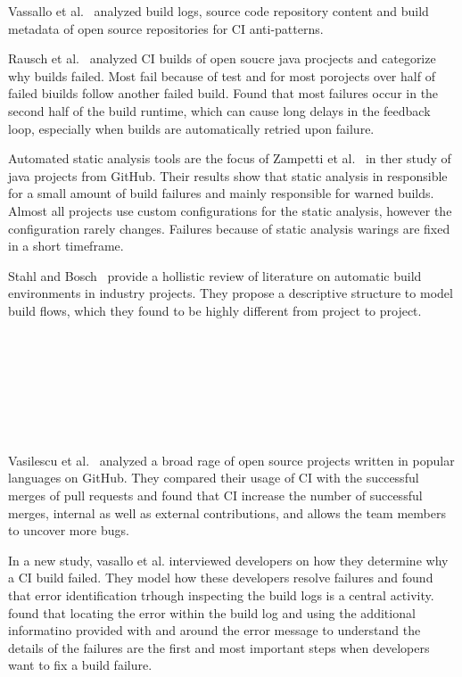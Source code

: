 \documentclass[\myrootdir/main.tex]{subfiles}
\begin{document}
Vassallo et al.~\cite{vassallo2019automated} analyzed build logs, source code repository content and build metadata of open source repositories for CI anti-patterns.

Rausch et al.~\cite{rausch2017empirical} analyzed CI builds of open soucre java procjects and categorize why builds failed.
Most fail because of test  and for most porojects over half of failed biuilds follow another failed build.
Found that most failures occur in the second half of the build runtime, which can cause long delays in the feedback loop, especially when builds are automatically retried upon failure.

Automated static analysis tools are the focus of Zampetti et al.~\cite{zampetti2017open} in ther study of java projects from GitHub.
Their results show that static analysis in responsible for a small amount of build failures and mainly responsible for warned builds.
Almost all projects use custom configurations for the static analysis, however the configuration rarely changes.
Failures because of static analysis warings are fixed in a short timeframe.

Stahl and Bosch~\cite{staahl2014modeling} provide a hollistic review of literature on automatic build environments in industry projects.
They propose a descriptive structure to model build flows, which they found to be highly different from project to project.

~\cite{holck2003continuous}

~\cite{schermann2016towards}

~\cite{hilton2017trade-offs}

~\cite{hilton2016usage}

Vasilescu et al.~\cite{vasilescu2015quality} analyzed a broad rage of open source projects written in popular languages on GitHub.
They compared their usage of CI with the successful merges of pull requests and found that CI increase the number of successful merges, internal as well as external contributions, and allows the team members to uncover more bugs.



In a new study, vasallo et al. interviewed developers on how they determine why a CI build failed.
They model how these developers resolve failures and found that error identification trhough inspecting the build logs is a central activity. 
found that locating the error within the build log and using the additional informatino provided with and around the error message to understand the details of the failures are the first and most important steps when developers want to fix a build failure.
~\cite{vassallo2019every}
\end{document}
